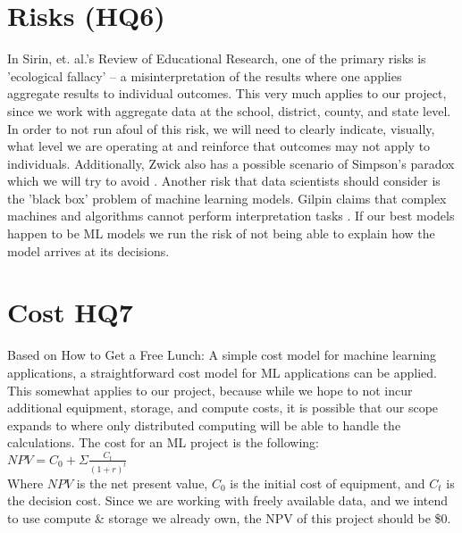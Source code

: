 \documentclass[sigconf,nonacm,11pt]{acmart}
\begin{document}
\section{Risks (HQ6)}
In Sirin, et. al.'s Review of Educational Research, one of the primary risks is 'ecological fallacy' \cite{sirin} -- a misinterpretation of the results where one applies aggregate results to individual outcomes. This very much applies to our project, since we work with aggregate data at the school, district, county, and state level.  In order to not run afoul of this risk, we will need to clearly indicate, visually, what level we are operating at and reinforce that outcomes may not apply to individuals. Additionally, Zwick \cite{collegescores} also has a possible scenario of Simpson's paradox which we will try to avoid . Another risk that data scientists should consider is the 'black box' problem of machine learning models. Gilpin claims that complex machines and algorithms cannot perform interpretation tasks \cite{gilpin}.  If our best models happen to be ML models we run the risk of not being able to explain how the model arrives at its decisions.

\section{Cost HQ7}
Based on How to Get a Free Lunch: A simple cost model for machine learning applications, a straightforward cost model for ML applications can be applied. \cite{domingos} This somewhat applies to our project, because while we hope to not incur additional equipment, storage, and compute costs, it is possible that our scope expands to where only distributed computing will be able to handle the calculations.  The cost for an ML project is the following:\\
$NPV = C_0 + \Sigma{\frac{C_t}{(1+r)^t}}$\\
Where $NPV$ is the net present value, $C_0$ is the initial cost of equipment, and $C_t$ is the decision cost. Since we are working with freely available data, and we intend to use compute \& storage we already own, the NPV of this project should be \$0.
\end{document}
